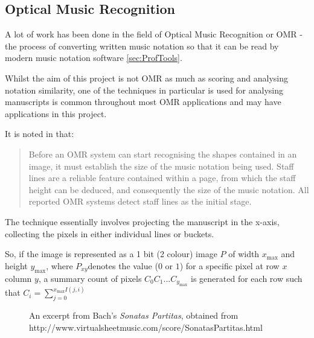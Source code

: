 \subsection{Optical Music Recognition}

A lot of work has been done in the field of Optical Music Recognition or OMR - the process of converting written music notation so that it can be read by modern music notation software \ref{sec:ProfTools}.

Whilst the aim of this project is not OMR as much as scoring and analysing notation similarity, one of the techniques in particular is used for analysing manuscripts is common throughout most OMR applications and may have applications in this project.

It is noted in \cite{bainbridge2001challenge} that:

\begin{quotation}
Before an OMR system can start recognising the shapes contained in an image, it must establish the size of the music notation being used. Staff lines are a reliable feature contained within a page, from which the staff height can be deduced, and consequently the size of the music notation. All reported OMR systems detect staff lines as the initial stage.
\end{quotation}

The technique essentially involves projecting the manuscript in the x-axis, collecting the pixels in either individual lines or buckets.

So, if the image is represented as a 1 bit (2 colour) image $P$ of width $x_{\text{max}}$ and height $y_{\text{max}}$, where $P_{xy}$denotes the value ($0$ or $1$) for a specific pixel at row $x$ column $y$, a summary count of pixels $C_0 C_1 ... C_{y_{\text{max}}}$ is generated for each row such that $C_i = \sum_{j = 0}^{x_\text{max} I(j, i)}$

\begin{figure}[h!]
  \centering
  \caption{An excerpt from Bach's \emph{Sonatas Partitas}, obtained from http://www.virtualsheetmusic.com/score/SonatasPartitas.html}
  \label{fig:SonatasPartitas}
\end{figure}

